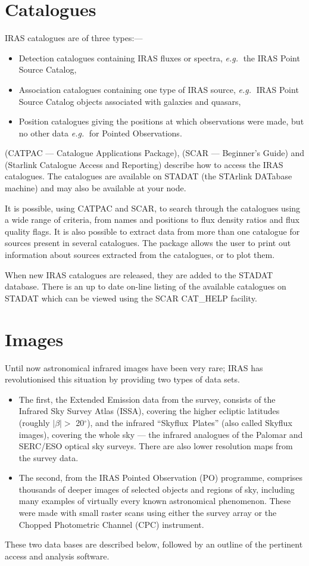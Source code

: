 \documentclass[11pt,nolof,noabs]{starlink}
\begin{document}
\section {Catalogues}
\label{m:cats}
IRAS catalogues are of three types:---
\begin{itemize}
\item Detection catalogues containing IRAS fluxes or spectra, \emph{e.g.}$\;$ the
IRAS Point Source Catalog,
\item Association catalogues containing one type of IRAS source,
\emph{e.g.}$\;$ IRAS Point Source Catalog objects associated with galaxies
and quasars,
\item Position catalogues giving the positions at which observations were
made, but no other data \emph{e.g.}$\;$ for Pointed Observations.
\end{itemize}
 (CATPAC --- Catalogue Applications Package),
 (SCAR --- Beginner's Guide) and  (Starlink Catalogue Access and
Reporting) describe how to access the IRAS catalogues. The catalogues are
available on STADAT (the STArlink DATabase machine) and may also be available
at your node.

It is possible, using CATPAC and SCAR, to search through the catalogues using
a wide range of criteria, from names and positions to flux density ratios and
flux quality flags.
It is also possible to extract data from more than one catalogue for sources
present in several catalogues.
The package allows the user to print out information about sources extracted
from the catalogues, or to plot them.

When new IRAS catalogues are released, they are added to the STADAT
database.
There is an up to date on-line listing of the available catalogues on STADAT
which can be viewed using the SCAR CAT\_HELP facility.

\section{Images}
\label{m:images}
Until now astronomical infrared images have been very rare; IRAS has
revolutionised this situation by providing two types of data sets.
\begin{itemize}
\item The first, the Extended Emission data from the survey, consists of
the Infrared Sky Survey Atlas (ISSA), covering the higher ecliptic latitudes
(roughly $| \beta | >$ 20$^{\circ}$), and the infrared ``Skyflux~Plates''
(also called Skyflux images), covering the whole sky --- the infrared analogues
of the Palomar and SERC/ESO optical sky surveys.
There are also lower resolution maps from the survey data.
\item The second, from the IRAS Pointed Observation (PO) programme,
comprises thousands of deeper images of selected objects and regions of sky,
including many examples of virtually every known astronomical phenomenon.
These were made with small raster scans using either the survey array or the
Chopped Photometric Channel (CPC) instrument.
\end{itemize}
These two data bases are described below, followed by an outline of the
pertinent access and analysis software.
\end{document}
